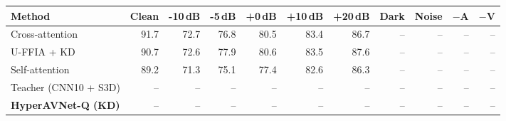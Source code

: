 \begin{tabular}{lrrrrrrrrrr}
\toprule
Method & Clean & -10\,dB & -5\,dB & +0\,dB & +10\,dB & +20\,dB & Dark & Noise & $-$A & $-$V \\
\midrule
Cross-attention~\cite{cui2024uffia} & 91.7 & 72.7 & 76.8 & 80.5 & 83.4 & 86.7 & -- & -- & -- & -- \\
U-FFIA + KD~\cite{cui2024uffia} & 90.7 & 72.6 & 77.9 & 80.6 & 83.5 & 87.6 & -- & -- & -- & -- \\
Self-attention~\cite{cui2024uffia} & 89.2 & 71.3 & 75.1 & 77.4 & 82.6 & 86.3 & -- & -- & -- & -- \\
\midrule
Teacher (CNN10 + S3D) & -- & -- & -- & -- & -- & -- & -- & -- & -- & -- \\
\textbf{HyperAVNet-Q (KD)} & -- & -- & -- & -- & -- & -- & -- & -- & -- & -- \\
\bottomrule
\end{tabular}
